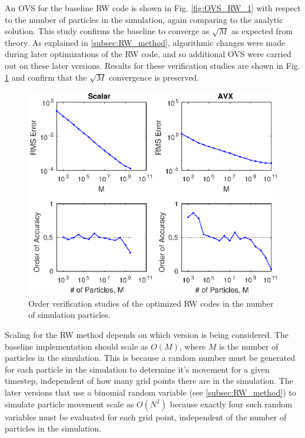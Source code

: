 \documentclass[letterpaper]{article}
\begin{document}
An OVS for the baseline RW code is shown in Fig. \ref{fig:OVS_RW_1} with respect to the number of particles in the simulation, again comparing to the analytic solution. This study confirms the baseline to converge as $\sqrt{M}$ as expected from theory. As explained in \ref{subsec:RW_method}, algorithmic changes were made during later optimizations of the RW code, and so additional OVS were carried out on these later versions. Results for these verification studies are shown in Fig. \ref{fig:OVS_RW_2} and confirm that the $\sqrt{M}$ convergence is preserved.

\begin{figure}\centering
  \includegraphics[width=\linewidth]{./plots/OVS_RW_2.eps}
  \caption{Order verification studies of the optimized RW codes in the number of simulation particles.}
  \label{fig:OVS_RW_2}
\end{figure}

Scaling for the RW method depends on which version is being considered. The baseline implementation should scale as $O(M)$, where $M$ is the number of particles in the simulation. This is because a random number must be generated for each particle in the simulation to determine it's movement for a given timestep, independent of how many grid points there are in the simulation. The later versions that use a binomial random variable (see \ref{subsec:RW_method}) to simulate particle movement scale as $O(N^2)$ because exactly four such random variables must be evaluated for each grid point, independent of the number of particles in the simulation.
\end{document}
